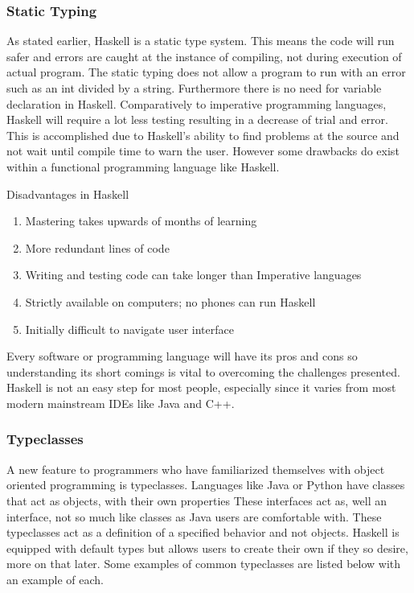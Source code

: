 \documentclass{article}
\begin{document}
    \subsubsection{Static Typing}
    As stated earlier, Haskell is a static type system. This means the code will run safer and errors are caught at the instance of compiling, not during execution of actual program. The static typing does not allow a program to run with an error such as an int divided by a string. Furthermore there is no need for variable declaration in Haskell. Comparatively to imperative programming languages, Haskell will require a lot less testing resulting in a decrease of trial and error. This is accomplished due to Haskell's ability to find problems at the source and not wait until compile time to warn the user. However some drawbacks do exist within a functional programming language like Haskell. 
    
    \medskip
    \caption{Disadvantages in Haskell}
       \begin{enumerate}
           \item Mastering takes upwards of months of learning
           \item More redundant lines of code
           \item Writing and testing code can take longer than Imperative languages
           \item Strictly available on computers; no phones can run Haskell
           \item Initially difficult to navigate user interface 
        \end{enumerate}
        
    \noindent Every software or programming language will have its pros and cons so understanding its short comings is vital to overcoming the challenges presented. Haskell is not an easy step for most people, especially since it varies from most modern mainstream IDEs like Java and C++. 
    
    \subsubsection{Typeclasses}
    A new feature to programmers who have familiarized themselves with object oriented programming is typeclasses. Languages like Java or Python have classes that act as objects, with their own properties These interfaces act as, well an interface, not so much like classes as Java users are comfortable with. These typeclasses act as a definition of a specified behavior and not objects. Haskell is equipped with default types but allows users to create their own if they so desire, more on that later. Some examples of common typeclasses are listed below with an example of each.
    \clearpage
    
\end{document}
